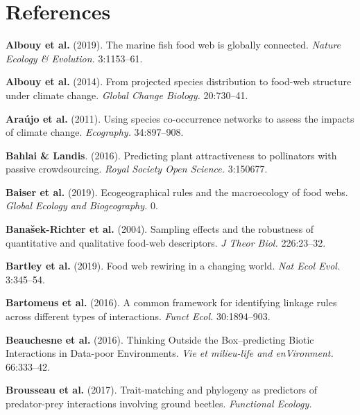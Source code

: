 \hypertarget{references}{%
\section*{References}\label{references}}

\hypertarget{refs}{}
\leavevmode\hypertarget{ref-AlboArch19}{}%
\textbf{Albouy et al.} (2019). The marine fish food web is globally
connected. \emph{Nature Ecology \& Evolution.} 3:1153--61.

\leavevmode\hypertarget{ref-AlboVele14}{}%
\textbf{Albouy et al.} (2014). From projected species distribution to
food-web structure under climate change. \emph{Global Change Biology.}
20:730--41.

\leavevmode\hypertarget{ref-ArauRoze11}{}%
\textbf{Araújo et al.} (2011). Using species co-occurrence networks to
assess the impacts of climate change. \emph{Ecography.} 34:897--908.

\leavevmode\hypertarget{ref-BahlLand16}{}%
\textbf{Bahlai \& Landis}. (2016). Predicting plant attractiveness to
pollinators with passive crowdsourcing. \emph{Royal Society Open
Science.} 3:150677.

\leavevmode\hypertarget{ref-BaisGrav19}{}%
\textbf{Baiser et al.} (2019). Ecogeographical rules and the
macroecology of food webs. \emph{Global Ecology and Biogeography.} 0.

\leavevmode\hypertarget{ref-BanaCatt04}{}%
\textbf{Banašek-Richter et al.} (2004). Sampling effects and the
robustness of quantitative and qualitative food-web descriptors. \emph{J
Theor Biol.} 226:23--32.

\leavevmode\hypertarget{ref-BartMcCa19}{}%
\textbf{Bartley et al.} (2019). Food web rewiring in a changing world.
\emph{Nat Ecol Evol.} 3:345--54.

\leavevmode\hypertarget{ref-BartGrav16}{}%
\textbf{Bartomeus et al.} (2016). A common framework for identifying
linkage rules across different types of interactions. \emph{Funct Ecol.}
30:1894--903.

\leavevmode\hypertarget{ref-BeauDesj16}{}%
\textbf{Beauchesne et al.} (2016). Thinking Outside the Box--predicting
Biotic Interactions in Data-poor Environments. \emph{Vie et milieu-life
and enVironment.} 66:333--42.

\leavevmode\hypertarget{ref-BrouGrav17}{}%
\textbf{Brousseau et al.} (2017). Trait-matching and phylogeny as
predictors of predator-prey interactions involving ground beetles.
\emph{Functional Ecology.}

